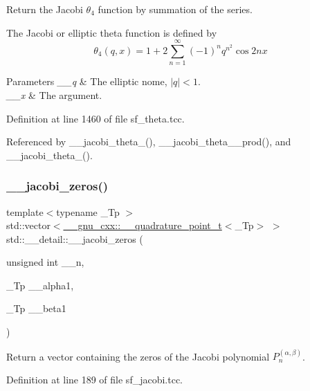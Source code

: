 Return the Jacobi $ \theta_4 $ function by summation of the series.

The Jacobi or elliptic theta function is defined by \[ \theta_4(q,x) = 1 + 2\sum_{n=1}^{\infty}(-1)^n q^{n^2}\cos{2nx} \]


\begin{DoxyParams}{Parameters}
{\em \+\_\+\+\_\+q} & The elliptic nome, $ |q| < 1 $. \\
\hline
{\em \+\_\+\+\_\+x} & The argument. \\
\hline
\end{DoxyParams}


Definition at line 1460 of file sf\+\_\+theta.\+tcc.



Referenced by \+\_\+\+\_\+jacobi\+\_\+theta\+\_(), \+\_\+\+\_\+jacobi\+\_\+theta\+\_\+\_\+prod(), and \+\_\+\+\_\+jacobi\+\_\+theta\+\_().

\mbox{\label{namespacestd_1_1____detail_a53800598007d45e144cf147c2408a3d6}} 
\subsubsection{\texorpdfstring{\+\_\+\+\_\+jacobi\+\_\+zeros()}{\_\_jacobi\_zeros()}}
{\footnotesize\ttfamily template$<$typename \+\_\+\+Tp $>$ \\
std\+::vector$<$\hyperlink{struct____gnu__cxx_1_1____quadrature__point__t}{\+\_\+\+\_\+gnu\+\_\+cxx\+::\+\_\+\+\_\+quadrature\+\_\+point\+\_\+t}$<$\+\_\+\+Tp$>$ $>$ std\+::\+\_\+\+\_\+detail\+::\+\_\+\+\_\+jacobi\+\_\+zeros (\begin{DoxyParamCaption}\item[{unsigned int}]{\+\_\+\+\_\+n,  }\item[{\+\_\+\+Tp}]{\+\_\+\+\_\+alpha1,  }\item[{\+\_\+\+Tp}]{\+\_\+\+\_\+beta1 }\end{DoxyParamCaption})}

Return a vector containing the zeros of the Jacobi polynomial $ P_n^{(\alpha,\beta)}$. 

Definition at line 189 of file sf\+\_\+jacobi.\+tcc.



